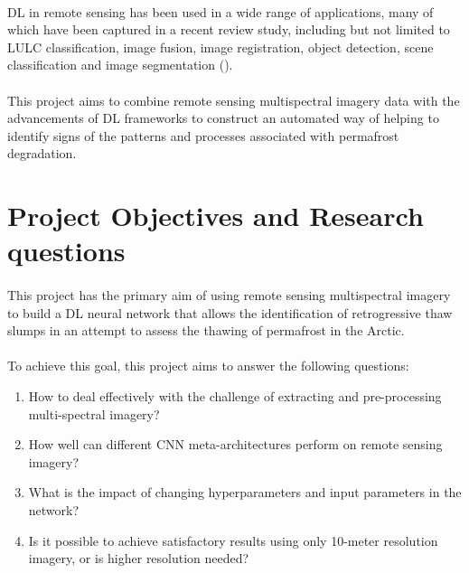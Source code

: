 \paragraph{}
\gls{DL} in remote sensing has been used in a wide range of applications, many of which have been captured in a recent review study, including but not limited to \gls{LULC} classification, image fusion, image registration, object detection, scene classification and image segmentation (\cite{MA2019166}).

\paragraph{}
This project aims to combine remote sensing multispectral imagery data with the advancements of \gls{DL} frameworks to construct an automated way of helping to identify signs of the patterns and processes associated with permafrost degradation.


\section{Project Objectives and Research questions} \label{projectqs}

\paragraph{}
This project has the primary aim of using remote sensing multispectral imagery to build a \gls{DL} neural network that allows the identification of retrogressive thaw slumps in an attempt to assess the thawing of permafrost in the Arctic.

\paragraph{}
To achieve this goal, this project aims to answer the following questions:

\begin{enumerate}
    \item How to deal effectively with the challenge of extracting and pre-processing multi-spectral imagery?
    \item How well can different \gls{CNN} meta-architectures perform on remote sensing imagery?
    \item What is the impact of changing hyperparameters and input parameters in the network?
    \item Is it possible to achieve satisfactory results using only 10-meter resolution imagery, or is higher resolution needed?
\end{enumerate}

